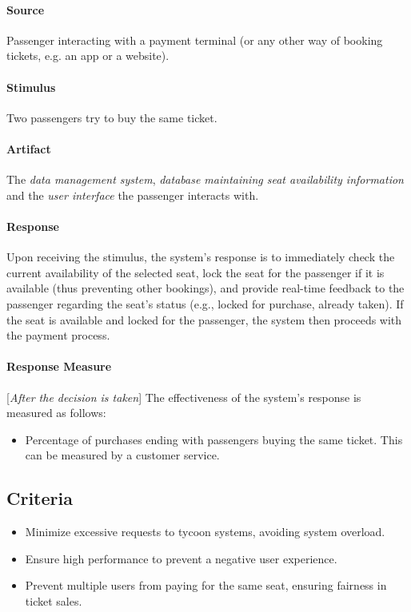 \paragraph{Source} Passenger interacting with a payment terminal (or any other way of booking tickets, e.g. an app or a website).
\paragraph{Stimulus} Two passengers try to buy the same ticket.
\paragraph{Artifact} The \textit{data management system}, \textit{database maintaining seat availability information} and the \textit{user interface} the passenger interacts with.
\paragraph{Response} Upon receiving the stimulus, the system's response is to immediately check the current availability of the selected seat, lock the seat for the passenger if it is available (thus preventing other bookings), and provide real-time feedback to the passenger regarding the seat's status (e.g., locked for purchase, already taken). If the seat is available and locked for the passenger, the system then proceeds with the payment process.
\paragraph{Response Measure}[\textit{After the decision is taken}] The effectiveness of the system's response is measured as follows:
\begin{itemize}
    \item Percentage of purchases ending with passengers buying the same ticket. This can be measured by a customer service.
\end{itemize}

\subsection*{Criteria}
\begin{itemize}
    \item Minimize excessive requests to tycoon systems, avoiding system overload.
    \item Ensure high performance to prevent a negative user experience.
    \item Prevent multiple users from paying for the same seat, ensuring fairness in ticket sales.
\end{itemize}

